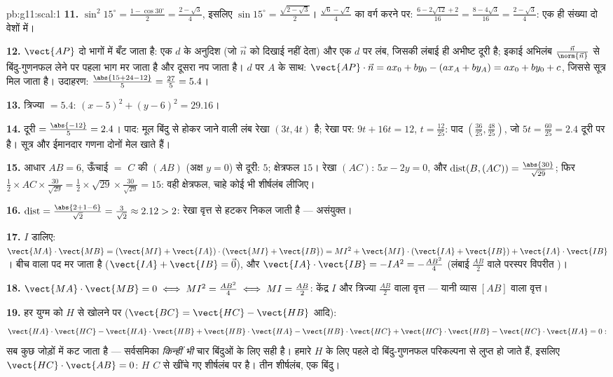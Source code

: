 \begin{solution}{pb:g11:scal:1}
\textbf{11.} $\sin^2 15^\circ = \frac{1 - \cos 30^\circ}{2}
= \frac{2 - \sqrt3}{4}$, इसलिए $\sin 15^\circ = \frac{\sqrt{2 - \sqrt3}}{2}$। $\frac{\sqrt6 - \sqrt2}{4}$ का वर्ग करने पर: $\frac{6 - 2\sqrt{12} + 2}{16} = \frac{8 - 4\sqrt3}{16} =
\frac{2 - \sqrt3}{4}$: एक ही संख्या
दो वेशों में।

\textbf{12.} $\vect{AP}$ दो भागों में बँट जाता है: एक $d$ के अनुदिश (जो $\vec n$
को दिखाई नहीं देता) और एक $d$ पर लंब, जिसकी लंबाई ही अभीष्ट दूरी है; इकाई
अभिलंब $\frac{\vec n}{\norm{\vec n}}$ से बिंदु-गुणनफल लेने पर पहला भाग मर जाता है और दूसरा नप जाता
है। $d$ पर $A$ के साथ: $\vect{AP} \cdot \vec n = a x_0 + b y_0 - (a x_A + b y_A) =
a x_0 + b y_0 + c$, जिससे सूत्र मिल जाता है। उदाहरण: $\frac{\abs{15 + 24 - 12}}{5} = \frac{27}{5} = 5.4$।

\textbf{13.} त्रिज्या $= 5.4$: $(x - 5)^2 + (y - 6)^2 = 29.16$।

\textbf{14.} दूरी $= \frac{\abs{-12}}{5} = 2.4$। पाद: मूल बिंदु से होकर जाने वाली लंब रेखा $(3t, 4t)$ है;
रेखा पर: $9t + 16t = 12$, $t = \frac{12}{25}$: पाद $\left(\frac{36}{25}, \frac{48}{25}\right)$, जो $5t = \frac{60}{25} = 2.4$ दूरी पर है। सूत्र और ईमानदार गणना
दोनों मेल खाते हैं।

\textbf{15.} आधार $AB = 6$, ऊँचाई $=$ $C$ की $(AB)$ (अक्ष $y = 0$) से दूरी:
$5$; क्षेत्रफल $15$। रेखा $(AC)$: $5x - 2y = 0$, और $\operatorname{dist}(B, (AC)) = \frac{\abs{30}}{\sqrt{29}}$; फिर $\frac12 \times AC \times \frac{30}{\sqrt{29}} =
\frac12 \times \sqrt{29} \times \frac{30}{\sqrt{29}} = 15$: वही
क्षेत्रफल, चाहे कोई भी शीर्षलंब लीजिए।

\textbf{16.} $\operatorname{dist} = \frac{\abs{2 + 1 - 6}}
{\sqrt2} = \frac{3}{\sqrt2} \approx 2.12 > 2$: रेखा वृत्त से हटकर निकल जाती है --- असंयुक्त।

\textbf{17.} $I$ डालिए: $\vect{MA} \cdot \vect{MB} = (\vect{MI} + \vect{IA}) \cdot
(\vect{MI} + \vect{IB}) = MI^2 + \vect{MI} \cdot (\vect{IA} +
\vect{IB}) + \vect{IA} \cdot \vect{IB}$। बीच वाला पद मर जाता है ($\vect{IA} + \vect{IB} = \vec 0$), और $\vect{IA} \cdot \vect{IB} = -IA^2 = -\frac{AB^2}{4}$
(लंबाई $\frac{AB}2$ वाले परस्पर विपरीत )।

\textbf{18.} $\vect{MA} \cdot \vect{MB} = 0 \iff MI^2 =
\frac{AB^2}{4} \iff MI = \frac{AB}{2}$: केंद्र $I$ और त्रिज्या $\frac{AB}2$ वाला वृत्त --- यानी व्यास
$[AB]$ वाला वृत्त।

\textbf{19.} हर युग्म को $H$ से खोलने पर ($\vect{BC} =
\vect{HC} - \vect{HB}$ आदि):
\[
\vect{HA} \cdot \vect{HC} - \vect{HA} \cdot \vect{HB}
+ \vect{HB} \cdot \vect{HA} - \vect{HB} \cdot \vect{HC}
+ \vect{HC} \cdot \vect{HB} - \vect{HC} \cdot \vect{HA} = 0 :
\]
सब कुछ जोड़ों में कट जाता है --- सर्वसमिका \emph{किन्हीं भी} चार बिंदुओं के
लिए सही है। हमारे $H$ के लिए पहले दो बिंदु-गुणनफल परिकल्पना से लुप्त हो
जाते हैं, इसलिए $\vect{HC} \cdot \vect{AB} = 0$: $H$ $C$ से खींचे गए शीर्षलंब पर है। तीन शीर्षलंब,
एक बिंदु।


\end{solution}
